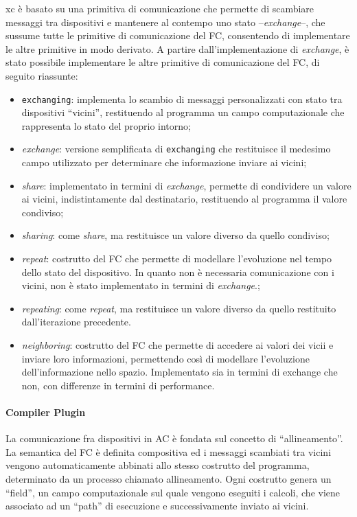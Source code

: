 \documentclass[13pt, a4paper]{article}
\begin{document}
\ac{xc} è basato su una primitiva di comunicazione che permette di scambiare messaggi tra dispositivi e mantenere al contempo uno stato --\emph{exchange}--,
che sussume tutte le primitive di comunicazione del \ac{FC},
consentendo di implementare le altre primitive in modo derivato.
%
A partire dall'implementazione di \emph{exchange}, è stato possibile implementare le altre primitive di comunicazione del \ac{FC},
di seguito riassunte:
\begin{itemize}
    \item \texttt{exchanging}: implementa lo scambio di messaggi personalizzati con stato tra dispositivi ``vicini'',
    restituendo al programma un campo computazionale che rappresenta lo stato del proprio intorno;
    \item \emph{exchange}: versione semplificata di \texttt{exchanging} che restituisce il medesimo campo utilizzato
    per determinare che informazione inviare ai vicini;
    \item \emph{share}: implementato in termini di \emph{exchange}, permette di condividere un valore ai vicini, indistintamente
    dal destinatario, restituendo al programma il valore condiviso;
    \item \emph{sharing}: come \emph{share}, ma restituisce un valore diverso da quello condiviso;
    \item \emph{repeat}: costrutto del \ac{FC} che permette di modellare l'evoluzione nel tempo dello stato del dispositivo.
        In quanto non è necessaria comunicazione con i vicini, non è stato implementato in termini di \emph{exchange}.;
    \item \emph{repeating}: come \emph{repeat}, ma restituisce un valore diverso da quello restituito dall'iterazione precedente.
    \item \emph{neighboring}: costrutto del \ac{FC} che permette di accedere ai valori dei vicii e inviare loro informazioni,
        permettendo così di modellare l'evoluzione dell'informazione nello spazio.
        Implementato sia in termini di exchange che non, con differenze in termini di performance.
\end{itemize}

\paragraph{Compiler Plugin}

La comunicazione fra dispositivi in \ac{AC} è fondata sul concetto di ``allineamento''.
%
La semantica del \ac{FC} è definita compositiva ed i messaggi scambiati tra vicini vengono automaticamente abbinati
    allo stesso costrutto del programma, determinato da un processo chiamato allineamento.
%
Ogni costrutto genera un ``field'', un campo computazionale sul quale vengono eseguiti i calcoli, che viene
associato ad un ``path'' di esecuzione e successivamente inviato ai vicini.
\end{document}
